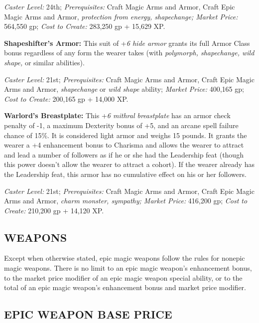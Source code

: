\documentclass{article}
\begin{document}
\textit{Caster Level: }24th; \textit{Prerequisites: }Craft Magic Arms and Armor, 
Craft Epic Magic Arms and Armor, \textit{protection from energy, shapechange; Market 
Price: }564,550 gp; \textit{Cost to Create: }283,250 gp + 15,629 XP. 

\textbf{Shapeshifter's Armor: }This suit of +\textit{6 hide armor }grants its full 
Armor Class bonus regardless of any form the wearer takes (with \textit{polymorph, 
shapechange, wild shape, }or similar abilities). 

\textit{Caster Level: }21st; \textit{Prerequisites: }Craft Magic Arms and Armor, 
Craft Epic Magic Arms and Armor, \textit{shapechange }or \textit{wild shape }ability; 
\textit{Market Price: }400,165 gp; \textit{Cost to Create: }200,165 gp + 14,000 
XP. 

\textbf{Warlord's Breastplate: }This +\textit{6 mithral breastplate }has an armor 
check penalty of -1, a maximum Dexterity bonus of +5, and an arcane spell failure 
chance of 15\%. It is considered light armor and weighs 15 pounds. It grants the 
wearer a +4 enhancement bonus to Charisma and allows the wearer to attract and 
lead a number of followers as if he or she had the Leadership feat (though this 
power doesn't allow the wearer to attract a cohort). If the wearer already has 
the Leadership feat, this armor has no cumulative effect on his or her followers. 

\textit{Caster Level: }21st; \textit{Prerequisites: }Craft Magic Arms and Armor, 
Craft Epic Magic Arms and Armor, \textit{charm monster, sympathy; Market Price: 
}416,200 gp; \textit{Cost to Create: }210,200 gp + 14,120 XP. 

\vspace{12pt}
\subsection*{{\LARGE{}WEAPONS }}

Except when otherwise stated, epic magic weapons follow the rules for nonepic magic 
weapons.  There is no limit to an epic magic weapon's enhancement bonus, to the 
market price modifier of an epic magic weapon special ability, or to the total 
of an epic magic weapon's enhancement bonus and market price modifier. 

\vspace{12pt}
\subsection*{EPIC WEAPON BASE PRICE }
\end{document}
